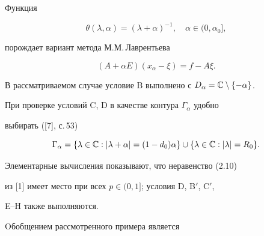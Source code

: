 \begin{exam}


Функция


$$


\theta(\lambda,\alpha)=(\lambda+\alpha)^{-1},\quad


\alpha\in(0,\alpha_0],


$$


порождает вариант метода М.М.\,Лаврентьева


\begin{equation}


(A+\alpha E)(x_\alpha-\xi)=f-A\xi.


\end{equation}


В рассматриваемом случае условие B выполнено с $D_\alpha=\Bbb 


C\setminus \{-\alpha\}$.


При проверке условий C, D в качестве контура $\Gamma_\alpha$ удобно 


выбирать ([7], с.\,53)


\begin{equation}


\Gamma_\alpha=\{\lambda\in\Bbb C:|\lambda+\alpha|=(1-d_0)\alpha\}


\cup\{\lambda\in\Bbb C:|\lambda|=R_0\}.


\end{equation}


Элементарные вычисления показывают, что неравенство (2.10) 


из [1] имеет место при всех $p\in(0,1]$; условия D, B$'$, C$'$,


E--H также выполняются.


\end{exam}





Oбобщением рассмотренного примера является





